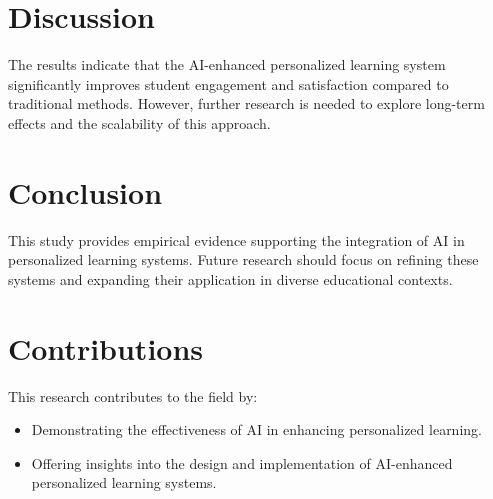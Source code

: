 \documentclass{article}
\begin{document}
\section{Discussion}
The results indicate that the AI-enhanced personalized learning system significantly improves student engagement and satisfaction compared to traditional methods. However, further research is needed to explore long-term effects and the scalability of this approach.

\section{Conclusion}
This study provides empirical evidence supporting the integration of AI in personalized learning systems. Future research should focus on refining these systems and expanding their application in diverse educational contexts.

\section{Contributions}
This research contributes to the field by:
\begin{itemize}
    \item Demonstrating the effectiveness of AI in enhancing personalized learning.
    \item Offering insights into the design and implementation of AI-enhanced personalized learning systems.
\end{itemize}



\end{document}

